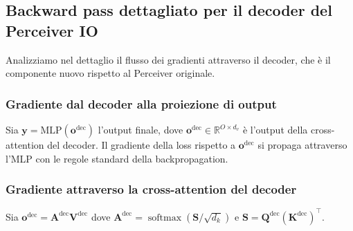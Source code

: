 \documentclass[12pt,a4paper]{article}
\begin{document}
\subsection{Backward pass dettagliato per il decoder del Perceiver IO}

Analizziamo nel dettaglio il flusso dei gradienti attraverso il decoder, che \`e il componente nuovo rispetto al Perceiver originale.

\subsubsection{Gradiente dal decoder alla proiezione di output}

Sia $\mathbf{y} = \text{MLP}(\mathbf{o}^{\text{dec}})$ l'output finale, dove $\mathbf{o}^{\text{dec}} \in \mathbb{R}^{O \times d_v}$ \`e l'output della cross-attention del decoder. Il gradiente della loss rispetto a $\mathbf{o}^{\text{dec}}$ si propaga attraverso l'MLP con le regole standard della backpropagation.

\subsubsection{Gradiente attraverso la cross-attention del decoder}

Sia $\mathbf{o}^{\text{dec}} = \mathbf{A}^{\text{dec}} \mathbf{V}^{\text{dec}}$ dove $\mathbf{A}^{\text{dec}} = \operatorname{softmax}(\mathbf{S}/\sqrt{d_k})$ e $\mathbf{S} = \mathbf{Q}^{\text{dec}} (\mathbf{K}^{\text{dec}})^\top$.
\end{document}
